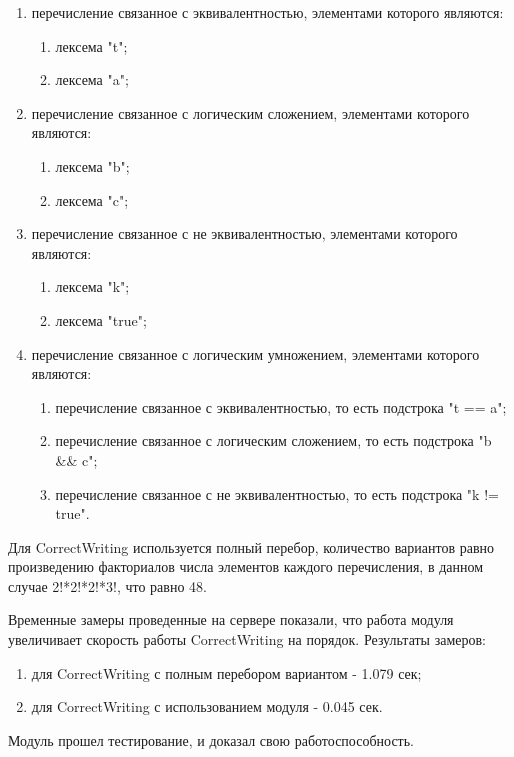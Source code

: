 \documentclass[a4paper,english,russian]{G2-105}
\begin{document}
\begin{enumerate}
    \item перечисление связанное с эквивалентностью, элементами которого являются: 
        \begin{enumerate}
            \item лексема "t";
            \item лексема "a";
        \end{enumerate}
    \item перечисление связанное с логическим сложением, элементами которого являются:
        \begin{enumerate}
            \item лексема "b";
            \item лексема "c";
        
        \end{enumerate}
    \item перечисление связанное с не эквивалентностью, элементами которого являются: 
        \begin{enumerate}
            \item лексема "k";
            \item лексема "true";
        \end{enumerate}
    \item перечисление связанное с логическим умножением, элементами которого являются:
        \begin{enumerate}
            \item перечисление связанное с эквивалентностью, то есть подстрока "t == a";
            \item перечисление связанное с логическим сложением, то есть подстрока "b \&\& c";
            \item перечисление связанное с не эквивалентностью, то есть подстрока "k != true".
        \end{enumerate}
\end{enumerate}
\par Для CorrectWriting используется полный перебор, количество вариантов равно произведению факториалов числа элементов каждого перечисления, в данном случае 2!*2!*2!*3!, что равно 48. 
\par Временные замеры проведенные на сервере показали, что работа модуля увеличивает скорость работы CorrectWriting на порядок. Результаты замеров:
\begin{enumerate}
    \item для CorrectWriting с полным перебором вариантом - 1.079 сек;
    \item для CorrectWriting с использованием модуля - 0.045 сек.
\end{enumerate}
\par Модуль прошел тестирование, и доказал свою работоспособность.
\end{document}
